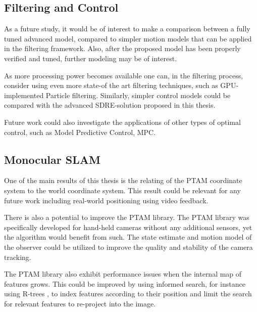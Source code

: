     \subsection{Filtering and Control}
        As a future study, it would be of interest to make a comparison between
        a fully tuned advanced model, compared to simpler motion models that
        can be applied in the filtering framework.
        Also, after the proposed model has been properly verified and tuned, further
        modeling may be of interest.

        As more processing power becomes available one can, in the filtering
        process, consider using even more state-of the art filtering techniques,
        such as GPU-implemented Particle filtering.
        Similarly, simpler control models could be compared with the
        advanced SDRE-solution proposed in this thesis.

        Future work could also investigate the applications of other types of
        optimal control, such as Model Predictive Control, MPC.

    \subsection{Monocular SLAM}
        One of the main results of this thesis is the relating of the PTAM
        coordinate system to the world coordinate system.
        This result could be relevant for any future work including real-world
        positioning using video feedback.

        There is also a potential to improve the PTAM library.
        The PTAM library was specifically developed for hand-held cameras
        without any additional sensors, yet the algorithm would benefit
        from such. The state estimate and motion model of the
        observer could be utilized to improve the quality and stability of
        the camera tracking.

        The PTAM library also exhibit performance issues when the internal map of features
        grows. This could be improved by using informed search,
        for instance using R-trees%
        , to index features according to their position and limit the search for
        relevant features to re-project into the image.
